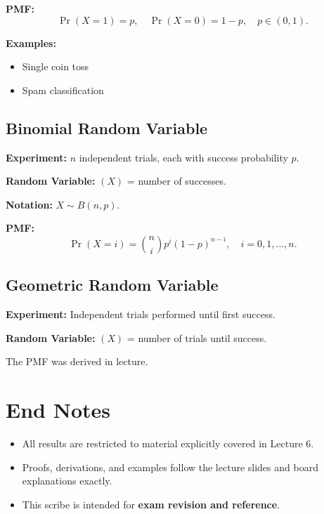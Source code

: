 \documentclass[11pt]{article}
\begin{document}
\textbf{PMF:}
\[
\Pr(X=1)=p, \quad \Pr(X=0)=1-p, \quad p\in(0,1).
\]

\textbf{Examples:}
\begin{itemize}
  \item Single coin toss
  \item Spam classification
\end{itemize}

\subsection{Binomial Random Variable}

\textbf{Experiment:} $n$ independent trials, each with success probability $p$.

\textbf{Random Variable:} $(X)$ = number of successes.

\textbf{Notation:} $X \sim B(n,p)$.

\textbf{PMF:}
\[
\Pr(X=i) = \binom{n}{i}p^i(1-p)^{n-i},
\quad i=0,1,\ldots,n.
\]

\subsection{Geometric Random Variable}

\textbf{Experiment:} Independent trials performed until first success.

\textbf{Random Variable:} $(X)$ = number of trials until success.

The PMF was derived in lecture.

\section{End Notes}

\begin{itemize}
  \item All results are restricted to material explicitly covered in Lecture 6.
  \item Proofs, derivations, and examples follow the lecture slides and board
        explanations exactly.
  \item This scribe is intended for \textbf{exam revision and reference}.
\end{itemize}
\end{document}
